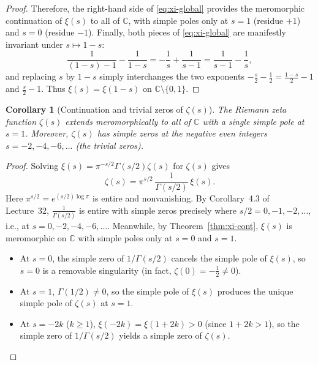 \documentclass[11pt]{article}
\theoremstyle{plain}
\newtheorem{corollary}[theorem]{Corollary}
\theoremstyle{definition}
\theoremstyle{boldremark}
\theoremstyle{remark}
\numberwithin{equation}{section}
\newcommand{\C}{\mathbb{C}}
\begin{document}
\begin{proof}
Therefore, the right-hand side of \eqref{eq:xi-global} provides the
meromorphic continuation of $\xi(s)$ to all of $\C$, with simple poles only
at $s=1$ (residue $+1$) and $s=0$ (residue $-1$). Finally, both pieces of
\eqref{eq:xi-global} are manifestly invariant under $s\mapsto 1-s$:
\[
 \frac{1}{(1-s)-1} - \frac{1}{1-s} = -\frac{1}{s} + \frac{1}{s-1}
 = \frac{1}{s-1} - \frac{1}{s},
\]
and replacing $s$ by $1-s$ simply interchanges the two exponents
$-\frac{s}{2}-\frac{1}{2}=\frac{1-s}{2}-1$ and $\frac{s}{2}-1$. Thus
$\xi(s)=\xi(1-s)$ on $\C\setminus\{0,1\}$.
\end{proof}

\begin{corollary}[Continuation and trivial zeros of $\zeta(s)$]\label{cor:zeta-cont}
The Riemann zeta function $\zeta(s)$ extends meromorphically to all of $\C$
with a single simple pole at $s=1$. Moreover, $\zeta(s)$ has simple zeros
at the negative even integers $s=-2,-4,-6,\dots$ (the \emph{trivial zeros}).
\end{corollary}

\begin{proof}
Solving $\xi(s)=\pi^{-s/2}\Gamma(s/2)\zeta(s)$ for $\zeta(s)$ gives
\[
 \zeta(s) = \pi^{s/2}\,\frac{1}{\Gamma(s/2)}\,\xi(s).
\]
Here $\pi^{s/2}=e^{(s/2)\log\pi}$ is entire and nonvanishing. By
Corollary~4.3 of Lecture~32, $\frac{1}{\Gamma(s/2)}$ is entire with simple
zeros precisely where $s/2=0,-1,-2,\dots$, i.e., at
$s=0,-2,-4,-6,\dots$. Meanwhile, by Theorem~\ref{thm:xi-cont}, $\xi(s)$ is
meromorphic on $\C$ with simple poles only at $s=0$ and $s=1$.
\begin{itemize}
 \item At $s=0$, the simple zero of $1/\Gamma(s/2)$ cancels the simple pole
       of $\xi(s)$, so $s=0$ is a removable singularity (in fact,
       $\zeta(0)=-\tfrac12\neq 0$).
 \item At $s=1$, $\Gamma(1/2)\neq 0$, so the simple pole of $\xi(s)$
       produces the unique simple pole of $\zeta(s)$ at $s=1$.
 \item At $s=-2k$ ($k\geq 1$), $\xi(-2k)=\xi(1+2k)>0$ (since $1+2k>1$), so
       the simple zero of $1/\Gamma(s/2)$ yields a simple zero of $\zeta(s)$.
       \qedhere
\end{itemize}
\end{proof}
\end{document}
